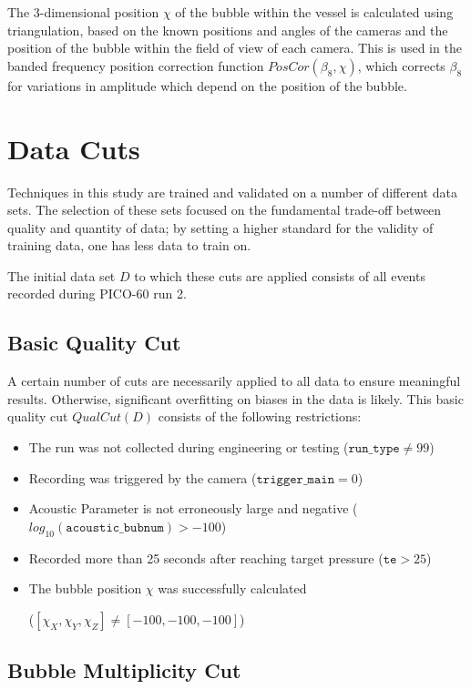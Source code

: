 \documentclass[10pt]{article}
\begin{document}
The 3-dimensional position $\chi$ of the bubble within the vessel is calculated using triangulation, based on the known positions and angles of the cameras and the position of the bubble within the field of view of each camera. This is used in the banded frequency position correction function $PosCor(\beta _{8}, \chi)$, which corrects $\beta _{8}$ for variations in amplitude which depend on the position of the bubble.

\section{Data Cuts}

Techniques in this study are trained and validated on a number of different data sets. The selection of these sets focused on the fundamental trade-off between quality and quantity of data; by setting a higher standard for the validity of training data, one has less data to train on.

The initial data set $D$ to which these cuts are applied consists of all events recorded during PICO-60 run 2.

\subsection{Basic Quality Cut}

A certain number of cuts are necessarily applied to all data to ensure meaningful results. Otherwise, significant overfitting on biases in the data is likely. This basic quality cut $QualCut(D)$ consists of the following restrictions:

\begin{itemize}
    \item The run was not collected during engineering or testing ($\texttt{run\_type}\neq99$)
    \item Recording was triggered by the camera ($\texttt{trigger\_main}=0$)
    \item Acoustic Parameter is not erroneously large and negative ($log_{10}(\texttt{acoustic\_bubnum})>-100$)
    \item Recorded more than 25 seconds after reaching target pressure ($\texttt{te}>25$)
    \item The bubble position $\chi$ was successfully calculated

    ($[\chi_{X}, \chi_{Y}, \chi_{Z}]\neq[-100, -100, -100]$)
\end{itemize}

\subsection{Bubble Multiplicity Cut}
\end{document}
